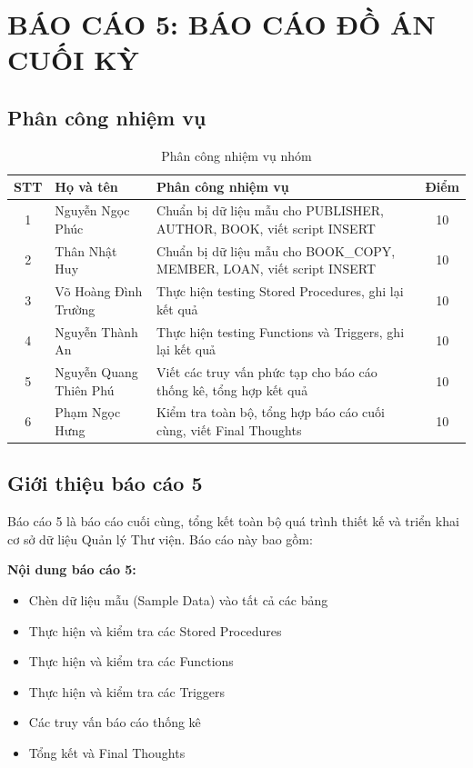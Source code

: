 \documentclass[12pt,a4paper]{article}
\begin{document}
\newpage
\section{BÁO CÁO 5: BÁO CÁO ĐỒ ÁN CUỐI KỲ}

\subsection{Phân công nhiệm vụ}

\begin{table}[H]
\centering
\caption{Phân công nhiệm vụ nhóm}
\begin{tabular}{@{}|c|l|p{8cm}|c|@{}}
\hline
\textbf{STT} & \textbf{Họ và tên} & \textbf{Phân công nhiệm vụ} & \textbf{Điểm} \\ \hline
1 & Nguyễn Ngọc Phúc &
Chuẩn bị dữ liệu mẫu cho PUBLISHER, AUTHOR, BOOK, viết script INSERT &
10 \\ \hline
2 & Thân Nhật Huy &
Chuẩn bị dữ liệu mẫu cho BOOK\_COPY, MEMBER, LOAN, viết script INSERT &
10 \\ \hline
3 & Võ Hoàng Đình Trường &
Thực hiện testing Stored Procedures, ghi lại kết quả &
10 \\ \hline
4 & Nguyễn Thành An &
Thực hiện testing Functions và Triggers, ghi lại kết quả &
10 \\ \hline
5 & Nguyễn Quang Thiên Phú &
Viết các truy vấn phức tạp cho báo cáo thống kê, tổng hợp kết quả &
10 \\ \hline
6 & Phạm Ngọc Hưng &
Kiểm tra toàn bộ, tổng hợp báo cáo cuối cùng, viết Final Thoughts &
10 \\ \hline
\end{tabular}
\end{table}

\subsection{Giới thiệu báo cáo 5}

Báo cáo 5 là báo cáo cuối cùng, tổng kết toàn bộ quá trình thiết kế và triển khai cơ sở dữ liệu Quản lý Thư viện. Báo cáo này bao gồm:

\textbf{Nội dung báo cáo 5:}
\begin{itemize}
    \item Chèn dữ liệu mẫu (Sample Data) vào tất cả các bảng
    \item Thực hiện và kiểm tra các Stored Procedures
    \item Thực hiện và kiểm tra các Functions
    \item Thực hiện và kiểm tra các Triggers
    \item Các truy vấn báo cáo thống kê
    \item Tổng kết và Final Thoughts
\end{itemize}
\end{document}
